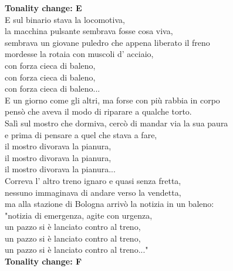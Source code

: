 \documentclass[10pt, twoside, a4paper]{article}
\begin{document}
\textbf{Tonality change: E}\\

E sul binario stava la locomotiva,   \\
la macchina pulsante sembrava fosse cosa viva,   \\
sembrava un giovane puledro che appena liberato il freno\\
mordesse la rotaia con muscoli d' acciaio,\\
con forza cieca di baleno,\\
con forza cieca di baleno,\\
con forza cieca di baleno...\\

E un giorno come gli altri, ma forse con più rabbia in corpo\\
pensò che aveva il modo di riparare a qualche torto.\\
Salì sul mostro che dormiva, cercò di mandar via la sua paura\\
e prima di pensare a quel che stava a fare,\\
il mostro divorava la pianura,\\
il mostro divorava la pianura,\\
il mostro divorava la pianura...\\

Correva l' altro treno ignaro e quasi senza fretta,\\
nessuno immaginava di andare verso la vendetta,\\
ma alla stazione di Bologna arrivò la notizia in un baleno:\\
"notizia di emergenza, agite con urgenza,\\
un pazzo si è lanciato contro al treno,\\
un pazzo si è lanciato contro al treno,\\
un pazzo si è lanciato contro al treno..."\\

\textbf{Tonality change: F}\\
\end{document}

